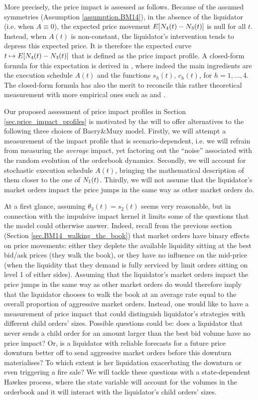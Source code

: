 \documentclass[10pt, article,table]{article}
\begin{document}
More precisely, the price impact is assessed as follows. Because of the assumed symmetries (Assumption \ref{assumption.BM14}), in the absence of the liquidator (i.e. when $A\equiv 0$), the expected price movement $\Expectation [\countingProc[4](t) - \countingProc[3](t)]$ is null for all $t$. Instead, when $A(t)$ is non-constant,  the liquidator's intervention tends to depress this expected price. It is therefore the expected curve $t\mapsto \Expectation[\countingProc[4](t)-\countingProc[3](t)]$ that is defined as the price impact profile. A closed-form formula for this expectation is derived in \citealp[Proposition 5.1 and Corollary 5.2]{BM14haw}, where indeed the main ingredients are the execution schedule $A(t)$ and the functions $s_h(t)$, $c_h(t)$, for $h=1,\dots,4$. The closed-form formula has also the merit to reconcile this rather theoretical measurement with more empirical ones such as \citealp{BN13mar} and  \citealp{MVMGFVLM09mar}.  

Our proposed assessment of price impact profiles in Section \ref{sec.price_impact_profiles} is motivated by the will to offer alternatives to the following three choices of Bacry\&Muzy model. Firstly, we will attempt a measurement of the impact profile that is scenario-dependent, i.e. we will refrain from measuring the \emph{average} impact, yet factoring out the ``noise'' associated with the random evolution of the orderbook dynamics. Secondly, we will account for stochastic execution schedule $A(t)$, bringing the mathematical description of them closer to the one of $\countingProc[1](t)$. Thirdly, we will not assume that the liquidator's market orders impact the price jumps in the same way as other market orders do.

At a first glance, assuming $\theta_3(t) = s_2(t)$ seems very reasonable, but in connection with the impulsive impact kernel it limits some of the questions that the model could otherwise answer. Indeed, recall from the previous section (Section \ref{sec.BM14_walking_the_book}) that market orders have binary effects on price movements: either they deplete the available liquidity sitting at the best bid/ask prices (they walk the book), or they have no influence on the mid-price (when the liquidity that they demand is fully serviced by limit orders sitting on level 1 of either sides). Assuming that the liquidator's market orders impact the price jumps in the same way as other market orders do would therefore imply that the liquidator chooses to walk the book at an average rate equal to the overall proportion of aggressive market orders. Instead, one would like to have a measurement of price impact that could distinguish liquidator's strategies with different child orders' sizes. Possible questions could be: does a liquidator that never sends a child order for an amount larger than the best bid volume have no price impact? Or, is a liquidator with reliable forecasts for a future price downturn better off to send aggressive market orders before this downturn materialises? To which extent is her liquidation exacerbating the downturn or even triggering a fire sale? We will tackle these questions with a state-dependent Hawkes process, where the state variable will account for the volumes in the orderbook and it will interact with the liquidator's child orders' sizes. 
 
\end{document}
